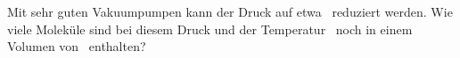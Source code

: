 Mit sehr guten Vakuumpumpen kann der Druck auf etwa \pvaO\ reduziert werden. Wie viele Moleküle sind bei diesem Druck und der Temperatur \thvO\ noch in einem Volumen von \VvaO\ enthalten?
